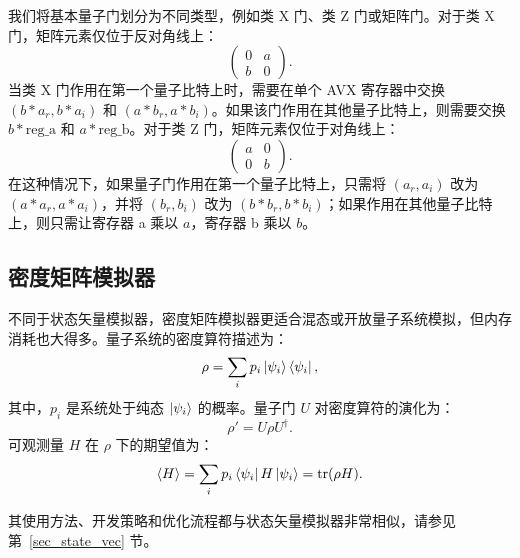 我们将基本量子门划分为不同类型，例如类 X 门、类 Z 门或矩阵门。对于类 X 门，矩阵元素仅位于反对角线上：
\begin{equation}
    \begin{pmatrix}
        0 & a \\
        b & 0
    \end{pmatrix}.
\end{equation}
当类 X 门作用在第一个量子比特上时，需要在单个 AVX 寄存器中交换 $(b*a_r, b*a_i)$ 和 $(a*b_r, a*b_i)$。如果该门作用在其他量子比特上，则需要交换 $b*\text{reg\_a}$ 和 $a*\text{reg\_b}$。对于类 Z 门，矩阵元素仅位于对角线上：
\begin{equation}
    \begin{pmatrix}
        a & 0 \\
        0 & b
    \end{pmatrix}.
\end{equation}
在这种情况下，如果量子门作用在第一个量子比特上，只需将 $(a_r, a_i)$ 改为 $(a*a_r, a*a_i)$，并将 $(b_r, b_i)$ 改为 $(b*b_r, b*b_i)$；如果作用在其他量子比特上，则只需让寄存器 a 乘以 $a$，寄存器 b 乘以 $b$。

\subsection{密度矩阵模拟器}
不同于状态矢量模拟器，密度矩阵模拟器更适合混态或开放量子系统模拟，但内存消耗也大得多。量子系统的密度算符描述为：
\begin{equation}
    \rho=\sum_ip_i\ket{\psi_i}\bra{\psi_i},
\end{equation}
其中，$p_i$ 是系统处于纯态 $\ket{\psi_i}$ 的概率。量子门 $U$ 对密度算符的演化为：
\begin{equation}
    \rho'=U\rho U^\dagger.
\end{equation}
可观测量 $H$ 在 $\rho$ 下的期望值为：
\begin{equation}
    \left<H\right> = \sum_ip_i\bra{\psi_i}H\ket{\psi_i}=\text{tr}(\rho H).
\end{equation}

其使用方法、开发策略和优化流程都与状态矢量模拟器非常相似，请参见第~\ref{sec_state_vec} 节。
